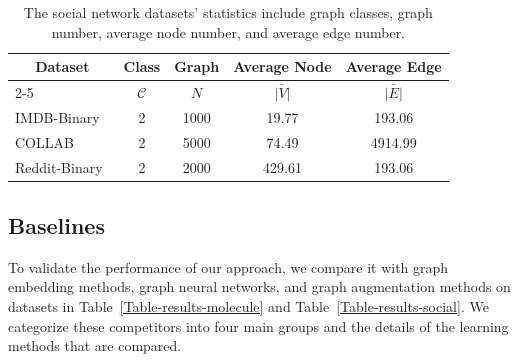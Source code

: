\documentclass[10pt,journal,compsoc]{IEEEtran}
\begin{document}
\begin{table}
\centering
\caption{The social network datasets' statistics include graph classes, graph number, average node number, and average edge number.}
{
\begin{tabular}{p{47 pt}cccc}
\toprule
\toprule
\multicolumn{1}{c}{\multirow{2}[0]{*}{\textbf{Dataset}}} & \textbf{Class} & \textbf{Graph} & \textbf{Average Node} & \textbf{Average Edge} \\
          \cline{2-5} & $\mathcal{C}$     & $N$     & $\bar{|V|}$     & $\bar{|E|}$ \\
\midrule
IMDB-Binary~\cite{dataset-mutag}         & 2                 & 1000              & 19.77                 & 193.06\\
COLLAB~\cite{dataset-dd}                 & 2                 & 5000              & 74.49                 & 4914.99\\
Reddit-Binary~\cite{dataset-ptc-mr}      & 2                 & 2000              & 429.61                & 193.06\\
\bottomrule
\end{tabular}}
\label{dataset-social-network}
\end{table}


\subsection{Baselines}
To validate the performance of our approach, we compare it with graph embedding methods, graph neural networks, and graph augmentation methods on datasets in Table~\ref{Table-results-molecule} and Table~\ref{Table-results-social}. We categorize these competitors into four main groups and the details of the learning methods that are compared.
\end{document}

